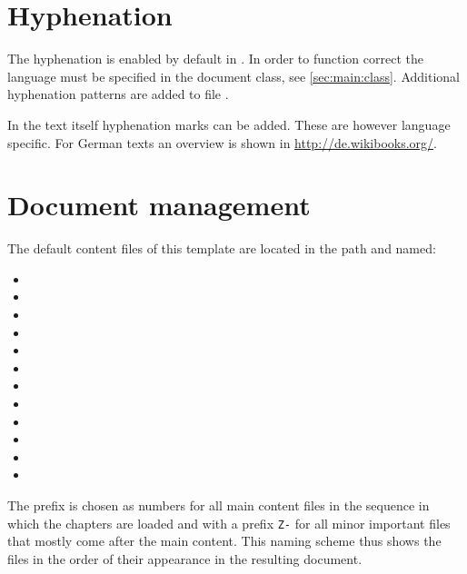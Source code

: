 \section{Hyphenation}
\label{sec:doc:faq:hyphenation}

The hyphenation is enabled by default in \latex. In order to function correct the language must be specified in the document class, see \cref{sec:main:class}. Additional hyphenation patterns are added to file .

In the text itself hyphenation marks can be added. These are however language specific. For German texts an overview is shown in \href{http://de.wikibooks.org/wiki/LaTeX-Wörterbuch:_Silbentrennung}{http://de.wikibooks.org/}.

\section{Document management}
\label{sec:doc:faq:documents}

The default content files of this template are located in the path  and named:

\begin{itemize}[noitemsep]
\item {}
\item {} 
\item {}
\item {}
\item {}
\item {}
\item {}
\item {}
\item {}
\item {}
\item {}
\item {}
\end{itemize}

The prefix is chosen as numbers for all main content files in the sequence in which the chapters are loaded and with a prefix \texttt{Z-} for all minor important files that mostly come after the main content. This naming scheme thus shows the files in the order of their appearance in the resulting document.


